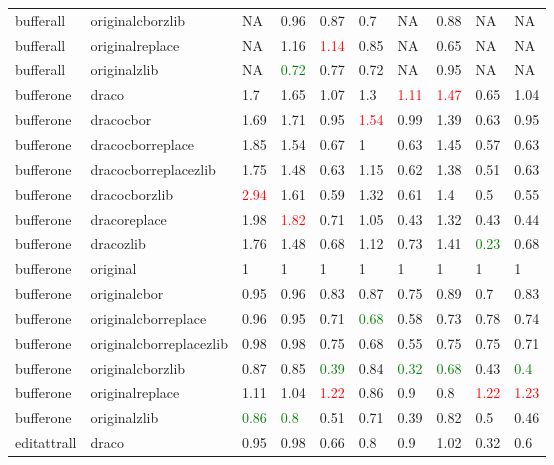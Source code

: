 \begin{landscape}
\begin{longtable}{llllllllll}
\rowcolor{lightgray}  bufferall & originalcborzlib & NA & 0.96 & 0.87 & 0.7 & NA & 0.88 & NA & NA\\
\rowcolor{lightgray}  bufferall & originalreplace & NA & 1.16 & \textcolor{red}{1.14} & 0.85 & NA & 0.65 & NA & NA\\
bufferall & originalzlib & NA & \textcolor{green}{0.72} & 0.77 & 0.72 & NA & 0.95 & NA & NA\\
bufferone & draco & 1.7 & 1.65 & 1.07 & 1.3 & \textcolor{red}{1.11} & \textcolor{red}{1.47} & 0.65 & 1.04\\
bufferone & dracocbor & 1.69 & 1.71 & 0.95 & \textcolor{red}{1.54} & 0.99 & 1.39 & 0.63 & 0.95\\
bufferone & dracocborreplace & 1.85 & 1.54 & 0.67 & 1 & 0.63 & 1.45 & 0.57 & 0.63\\
bufferone & dracocborreplacezlib & 1.75 & 1.48 & 0.63 & 1.15 & 0.62 & 1.38 & 0.51 & 0.63\\
bufferone & dracocborzlib & \textcolor{red}{2.94} & 1.61 & 0.59 & 1.32 & 0.61 & 1.4 & 0.5 & 0.55\\
bufferone & dracoreplace & 1.98 & \textcolor{red}{1.82} & 0.71 & 1.05 & 0.43 & 1.32 & 0.43 & 0.44\\
bufferone & dracozlib & 1.76 & 1.48 & 0.68 & 1.12 & 0.73 & 1.41 & \textcolor{green}{0.23} & 0.68\\
bufferone & original & 1 & 1 & 1 & 1 & 1 & 1 & 1 & 1\\
bufferone & originalcbor & 0.95 & 0.96 & 0.83 & 0.87 & 0.75 & 0.89 & 0.7 & 0.83\\
bufferone & originalcborreplace & 0.96 & 0.95 & 0.71 & \textcolor{green}{0.68} & 0.58 & 0.73 & 0.78 & 0.74\\
bufferone & originalcborreplacezlib & 0.98 & 0.98 & 0.75 & 0.68 & 0.55 & 0.75 & 0.75 & 0.71\\
bufferone & originalcborzlib & 0.87 & 0.85 & \textcolor{green}{0.39} & 0.84 & \textcolor{green}{0.32} & \textcolor{green}{0.68} & 0.43 & \textcolor{green}{0.4}\\
\rowcolor{lightgray}  bufferone & originalreplace & 1.11 & 1.04 & \textcolor{red}{1.22} & 0.86 & 0.9 & 0.8 & \textcolor{red}{1.22} & \textcolor{red}{1.23}\\
\rowcolor{lightgray}  bufferone & originalzlib & \textcolor{green}{0.86} & \textcolor{green}{0.8} & 0.51 & 0.71 & 0.39 & 0.82 & 0.5 & 0.46\\
\rowcolor{lightgray}  editattrall & draco & 0.95 & 0.98 & 0.66 & 0.8 & 0.9 & 1.02 & 0.32 & 0.6\\

\end{longtable}
\end{landscape}
